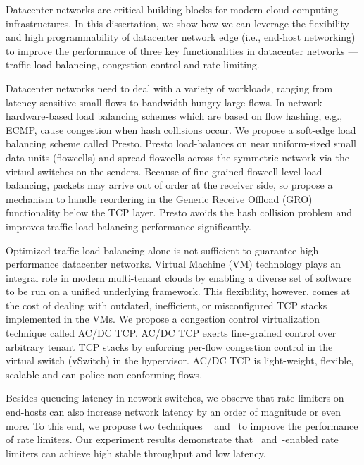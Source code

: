 
\vcinfo{}


Datacenter networks are critical building blocks for modern cloud computing 
infrastructures. 
In this dissertation, we show how we can leverage 
the flexibility and high programmability of datacenter network edge 
(i.e., end-host networking)~\cite{ovs-extending,pfaff2015design} to 
improve the performance of three key functionalities in datacenter networks --- traffic load balancing, 
congestion control and rate limiting.

Datacenter networks need to deal with a variety of workloads, ranging
from latency-sensitive small flows to bandwidth-hungry
large flows. In-network hardware-based load balancing schemes which are based on flow hashing,
e.g., ECMP, cause congestion when hash collisions occur. 
We propose a soft-edge load balancing scheme called Presto.
Presto load-balances on near uniform-sized small data units (flowcells) and 
spread flowcells across the symmetric network via the virtual switches on the senders.
Because of fine-grained flowcell-level load balancing, packets may arrive out of order
at the receiver side, so propose a mechanism to handle reordering in the 
Generic Receive Offload (GRO) functionality below the TCP layer.
Presto avoids the hash collision problem and improves traffic load balancing performance significantly.

Optimized traffic load balancing alone is not sufficient to 
guarantee high-performance datacenter networks. 
Virtual Machine (VM) technology plays an integral role in
modern multi-tenant clouds by enabling a diverse set of software to be run
on a unified underlying framework. This flexibility, however,
comes at the cost of dealing with outdated, inefficient,
or misconfigured TCP stacks implemented in the VMs. 
We propose a congestion control virtualization technique called AC/DC TCP.
AC/DC TCP exerts fine-grained control over arbitrary tenant
TCP stacks by enforcing per-flow congestion control in
the virtual switch (vSwitch) in the hypervisor. AC/DC TCP is light-weight,
flexible, scalable and can police non-conforming flows. 

Besides queueing latency in network switches, we observe that 
rate limiters on end-hosts can also increase network latency by an order of magnitude or even more. 
To this end, we propose two techniques \textemdash\xspace~\dem{} and~\spring{} to 
improve the performance of rate limiters.
Our experiment results demonstrate that~\dem{} and~\spring{}-enabled
rate limiters can achieve high stable throughput and low latency.


